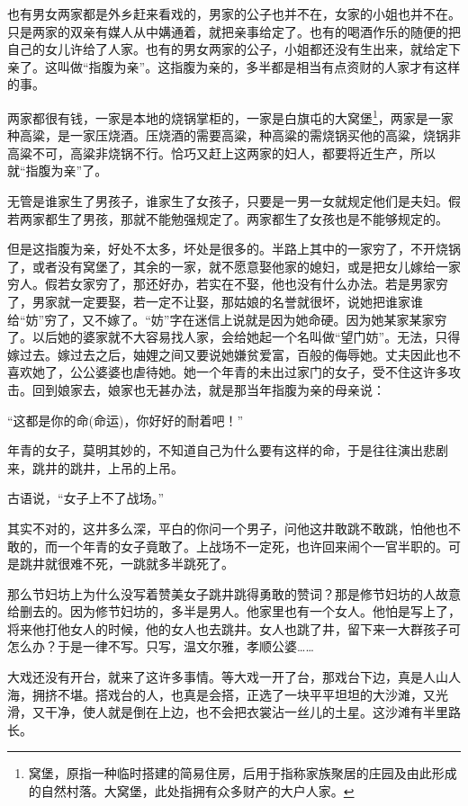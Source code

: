\par 也有男女两家都是外乡赶来看戏的，男家的公子也并不在，女家的小姐也并不在。只是两家的双亲有媒人从中媾通着，就把亲事给定了。也有的喝酒作乐的随便的把自己的女儿许给了人家。也有的男女两家的公子，小姐都还没有生出来，就给定下亲了。这叫做“指腹为亲”。这指腹为亲的，多半都是相当有点资财的人家才有这样的事。
\par 两家都很有钱，一家是本地的烧锅掌柜的，一家是白旗屯的大窝堡\footnote{窝堡，原指一种临时搭建的简易住房，后用于指称家族聚居的庄园及由此形成的自然村落。大窝堡，此处指拥有众多财产的大户人家。}，两家是一家种高粱，是一家压烧酒。压烧酒的需要高粱，种高粱的需烧锅买他的高粱，烧锅非高粱不可，高粱非烧锅不行。恰巧又赶上这两家的妇人，都要将近生产，所以就“指腹为亲”了。
\par 无管是谁家生了男孩子，谁家生了女孩子，只要是一男一女就规定他们是夫妇。假若两家都生了男孩，那就不能勉强规定了。两家都生了女孩也是不能够规定的。
\par 但是这指腹为亲，好处不太多，坏处是很多的。半路上其中的一家穷了，不开烧锅了，或者没有窝堡了，其余的一家，就不愿意娶他家的媳妇，或是把女儿嫁给一家穷人。假若女家穷了，那还好办，若实在不娶，他也没有什么办法。若是男家穷了，男家就一定要娶，若一定不让娶，那姑娘的名誉就很坏，说她把谁家谁给“妨”穷了，又不嫁了。“妨”字在迷信上说就是因为她命硬。因为她某家某家穷了。以后她的婆家就不大容易找人家，会给她起一个名叫做“望门妨”。无法，只得嫁过去。嫁过去之后，妯娌之间又要说她嫌贫爱富，百般的侮辱她。丈夫因此也不喜欢她了，公公婆婆也虐待她。她一个年青的未出过家门的女子，受不住这许多攻击。回到娘家去，娘家也无甚办法，就是那当年指腹为亲的母亲说：
\par “这都是你的命(命运)，你好好的耐着吧！”
\par 年青的女子，莫明其妙的，不知道自己为什么要有这样的命，于是往往演出悲剧来，跳井的跳井，上吊的上吊。
\par 古语说，“女子上不了战场。”
\par 其实不对的，这井多么深，平白的你问一个男子，问他这井敢跳不敢跳，怕他也不敢的，而一个年青的女子竟敢了。上战场不一定死，也许回来闹个一官半职的。可是跳井就很难不死，一跳就多半跳死了。
\par 那么节妇坊上为什么没写着赞美女子跳井跳得勇敢的赞词？那是修节妇坊的人故意给删去的。因为修节妇坊的，多半是男人。他家里也有一个女人。他怕是写上了，将来他打他女人的时候，他的女人也去跳井。女人也跳了井，留下来一大群孩子可怎么办？于是一律不写。只写，温文尔雅，孝顺公婆……
\par 大戏还没有开台，就来了这许多事情。等大戏一开了台，那戏台下边，真是人山人海，拥挤不堪。搭戏台的人，也真是会搭，正选了一块平平坦坦的大沙滩，又光滑，又干净，使人就是倒在上边，也不会把衣裳沾一丝儿的土星。这沙滩有半里路长。
